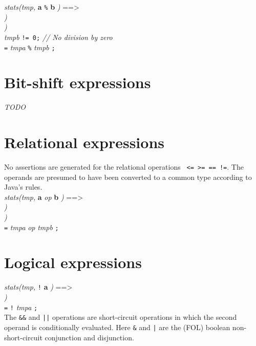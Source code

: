 \documentclass{report}%
\newcommand{\ind}{\hspace*{2em}}
\begin{document}
\noindent
{\em stats(tmp, }{\bf a} {\tt \%} {\bf b} {\em )} ==> \\
\ind {\em stats(tmpa, }{\bf a} {\em )} \\
\ind {\em stats(tmpb, }{\bf b} {\em )} \\
\ind {\tt //@ assert} {\em tmpb} {\tt != 0;} {\em // No division by zero}\\
\ind {\em T tmp} {\tt =} {\em tmpa} {\tt \%} {\em tmpb} {\tt ;}\\

\section{Bit-shift expressions}

{\em TODO}

\section{Relational expressions}

\noindent
No assertions are generated for the relational operations {\tt < > <= >= == !=}. The operands are presumed to have been converted to a common type according to Java's rules.\\

\noindent
{\em stats(tmp, }{\bf a} {\em op} {\bf b} {\em )} ==> \\
\ind {\em stats(tmpa, }{\bf a} {\em )} \\
\ind {\em stats(tmpb, }{\bf b} {\em )} \\
\ind {\em T tmp} {\tt =} {\em tmpa} {\em op} {\em tmpb} {\tt ;}\\

\section{Logical expressions}

\noindent
{\em stats(tmp,} {\tt !} {\bf a} {\em )} ==> \\
\ind {\em stats(tmpa, }{\bf a} {\em )} \\
\ind {\em T tmp} {\tt =} {\tt !} {\em tmpa} {\tt ;}\\

\noindent
The {\tt \&\&} and {\tt ||} operations are short-circuit operations in which the second operand is conditionally evaluated.
Here {\tt \&} and {\tt |} are the (FOL) boolean non-short-circuit conjunction and disjunction.\\
\end{document}
